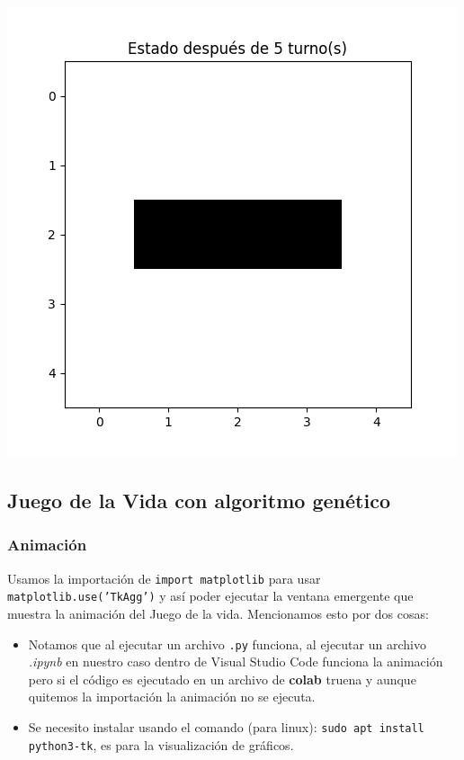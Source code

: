 \begin{itemize}
\begin{center}
        \includegraphics[scale=0.4]{IMA/ejemplosJuegoVida/ejemplo 2.6.png}
    \end{center}    
\end{itemize}


\subsection{Juego de la Vida con algoritmo genético}

\subsubsection*{Animación}

Usamos la importación de \texttt{import matplotlib} para usar \texttt{matplotlib.use('TkAgg')}
y así poder ejecutar la ventana emergente que muestra la animación del Juego de la vida. 
Mencionamos esto por dos cosas:

\begin{itemize}
    \item Notamos que al ejecutar un archivo \texttt{.py} funciona, al ejecutar un archivo 
    \textit{.ipynb} en nuestro caso dentro de Visual Studio Code funciona la animación pero si
    el código es ejecutado en un archivo de \textbf{colab} truena y aunque quitemos la 
    importación la animación no se ejecuta. 

    \item Se necesito instalar usando el comando (para linux): 
    \texttt{sudo apt install python3-tk}, es para la visualización de gráficos.
\end{itemize}

